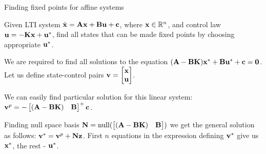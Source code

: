 \documentclass{beamer}
\begin{document}
\begin{frame}{Finding fixed points for affine systems}
\begin{flushleft}

Given LTI system $\dot{\mathbf{x}} = \mathbf{A} \mathbf{x} + \mathbf{B} \mathbf{u} + \mathbf{c}$, where $\mathbf{x} \in \mathbb{R}^n$, and control law $\mathbf{u} = -\mathbf{K}\mathbf{x} + \mathbf{u}^*$, find all states that can be made fixed points by choosing appropriate $\mathbf{u}^*$.

\bigskip

We are required to find all solutions to the equation $(\mathbf{A} - \mathbf{B}\mathbf{K})\mathbf{x}^* + \mathbf{B}\mathbf{u}^* + \mathbf{c} = \mathbf{0}$. Let us define state-control pairs $\mathbf{v} = \begin{bmatrix} \mathbf{x} \\ \mathbf{u} \end{bmatrix}$. 

\bigskip

We can easily find particular solution for this linear system: $\mathbf{v}^p = -\begin{bmatrix} (\mathbf{A} - \mathbf{B}\mathbf{K}) & \mathbf{B} \end{bmatrix}^+\mathbf{c}$. 

\bigskip

Finding null space basis $\mathbf{N} = \text{null}(\begin{bmatrix} (\mathbf{A} - \mathbf{B}\mathbf{K}) & \mathbf{B} \end{bmatrix})$ we get the general solution as follows: $\mathbf{v}^* = \mathbf{v}^p + \mathbf{N}\mathbf{z}$. First $n$ equations in the expression defining $\mathbf{v}^*$ give us $\mathbf{x}^*$, the rest - $\mathbf{u}^*$.

\end{flushleft}
\end{frame}
\end{document}
